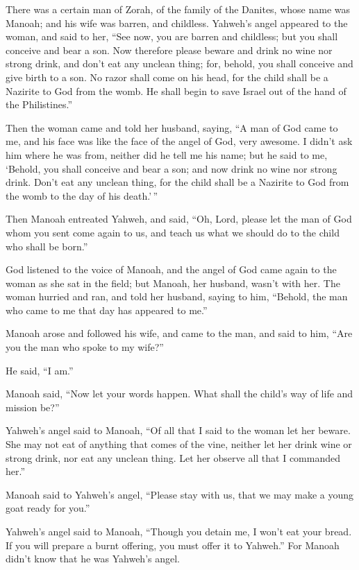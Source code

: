  There was a certain man of Zorah, of the family of the
Danites, whose name was Manoah; and his wife was barren, and childless.
 Yahweh's angel appeared to the woman, and said to her,
``See now, you are barren and childless; but you shall conceive and bear
a son.  Now therefore please beware and drink no wine nor
strong drink, and don't eat any unclean thing;  for, behold,
you shall conceive and give birth to a son. No razor shall come on his
head, for the child shall be a Nazirite to God from the womb. He shall
begin to save Israel out of the hand of the Philistines.''

 Then the woman came and told her husband, saying, ``A man
of God came to me, and his face was like the face of the angel of God,
very awesome. I didn't ask him where he was from, neither did he tell me
his name;  but he said to me, `Behold, you shall conceive
and bear a son; and now drink no wine nor strong drink. Don't eat any
unclean thing, for the child shall be a Nazirite to God from the womb to
the day of his death.'\,''

 Then Manoah entreated Yahweh, and said, ``Oh, Lord, please
let the man of God whom you sent come again to us, and teach us what we
should do to the child who shall be born.''

 God listened to the voice of Manoah, and the angel of God
came again to the woman as she sat in the field; but Manoah, her
husband, wasn't with her.  The woman hurried and ran, and
told her husband, saying to him, ``Behold, the man who came to me that
day has appeared to me.''

 Manoah arose and followed his wife, and came to the man,
and said to him, ``Are you the man who spoke to my wife?''

He said, ``I am.''

 Manoah said, ``Now let your words happen. What shall the
child's way of life and mission be?''

 Yahweh's angel said to Manoah, ``Of all that I said to the
woman let her beware.  She may not eat of anything that
comes of the vine, neither let her drink wine or strong drink, nor eat
any unclean thing. Let her observe all that I commanded her.''

 Manoah said to Yahweh's angel, ``Please stay with us, that
we may make a young goat ready for you.''

 Yahweh's angel said to Manoah, ``Though you detain me, I
won't eat your bread. If you will prepare a burnt offering, you must
offer it to Yahweh.'' For Manoah didn't know that he was Yahweh's angel.

